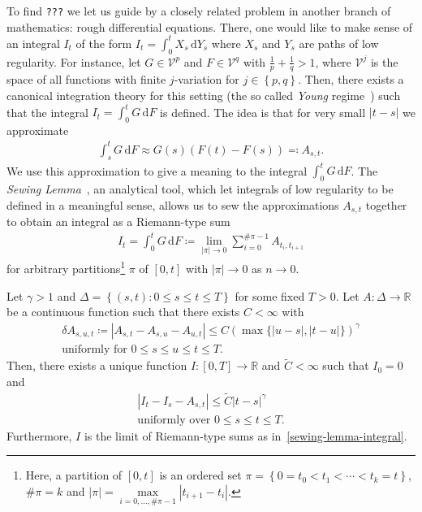 To find \texttt{???} we let us guide by a closely related problem in another branch of mathematics: rough differential equations. There, one would like to make sense of an integral \(I_t\)  of the form \(I_t = \int^t_0 X_s \, \mathrm{d}Y_s\) where \(X_s\) and \(Y_s\) are paths of low regularity. For instance, let \(G \in \mathcal{V}^p\) and \(F \in \mathcal{V}^q\) with \(\frac{1}{p} + \frac{1}{q} > 1\), where \(\mathcal{V}^j\) is the space of all functions with finite \(j\)-variation for \( j \in \left \{ p,q \right \} \). Then, there exists a canonical integration theory for this setting (the so called \emph{Young} regime~\cite{Young1936AnIO}) such that the integral \(I_t = \int^t_0 G \, \mathrm{d}F\) is defined. The idea is that for very small \(|t-s|\) we approximate 
\begin{align*}
    \int^t_s G \, \mathrm{d}F \approx G(s)(F(t) - F(s)) \eqqcolon A_{s,t}.
\end{align*}
We use this approximation to give a meaning to the integral \(\int^t_0 G \, \mathrm{d}F\).
The \emph{Sewing Lemma}~\cite{GUBINELLI200486}, an analytical tool, which let integrals of low regularity to be defined in a meaningful sense, allows us to sew the approximations \(A_{s,t}\) together to obtain an integral as a Riemann-type sum
\begin{align}\label{sewing-lemma-integral}
    I_t = \int^t_0 G \, \mathrm{d}F \coloneqq \lim\limits_{|\pi| \to 0} \sum\limits_{i=0}^{\# \pi - 1} A_{t_i,t_{i+1}}
\end{align}
for arbitrary partitions\footnote{Here, a partition of \([0,t]\) is an ordered set \(\pi = \left \{ 0 = t_0 < t_1 < \cdots < t_k = t  \right \} \), \( \# \pi = k \) and \(|\pi| = \max\limits_{i=0, \ldots ,\# \pi - 1} |t_{i+1} - t_{i}|\).} \( \pi \) of \([0,t]\) with \(|\pi| \to 0\) as \(n \to 0\).
\begin{lemma}
    Let \(\gamma > 1\) and \( \Delta = \left \{ (s,t) :  0 \leq s \leq t \leq T\right \} \) for some fixed \(T > 0\). Let \(A: \Delta \to \mathbb{R}\) be a continuous function such that there exists \( C <\infty \) with
    \begin{gather}
        \delta A_{s,u,t} \coloneqq |A_{s,t} - A_{s,u} - A_{u,t}| \leq C {(\max \{|u-s|,|t-u|\})}^\gamma \label{sewing-lemma-condition}\\
        \text{uniformly for \(0 \leq s \leq u \leq t \leq T\)}. \nonumber
    \end{gather} 
    Then, there exists a unique function \(I: [0,T] \to \mathbb{R}\) and \(\tilde C < {\infty}\)  such that \(I_0 = 0\) and 
    \begin{gather*}
        |I_t - I_s - A_{s,t}| \leq \tilde C|t-s|^\gamma \\
        \text{uniformly over \(0 \leq s \leq t \leq T\).}
    \end{gather*}  
    Furthermore, \(I\) is the limit of Riemann-type sums as in~\eqref{sewing-lemma-integral}.  
\end{lemma}
